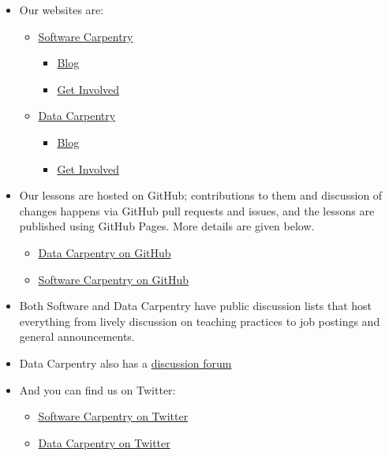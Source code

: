 \begin{itemize}
\item
  Our websites are:

  \begin{itemize}
    \item
    \href{http://software-carpentry.org}{Software Carpentry}

    \begin{itemize}
        \item
      \href{http://software-carpentry.org/blog/}{Blog}
    \item
      \href{http://software-carpentry.org/join/}{Get Involved}
    \end{itemize}
  \item
    \href{http://datacarpentry.org}{Data Carpentry}

    \begin{itemize}
        \item
      \href{http://datacarpentry.org/blog/}{Blog}
    \item
      \href{http://datacarpentry.org/involved/}{Get Involved}
    \end{itemize}
  \end{itemize}
\item
  Our lessons are hosted on GitHub; contributions to them and discussion
  of changes happens via GitHub pull requests and issues, and the
  lessons are published using GitHub Pages. More details are given
  below.

  \begin{itemize}
    \item
    \href{https://github.com/datacarpentry}{Data Carpentry on GitHub}
  \item
    \href{https://github.com/swcarpentry}{Software Carpentry on GitHub}
  \end{itemize}
\item
  Both Software and Data Carpentry have public discussion lists that
  host everything from lively discussion on teaching practices to job
  postings and general announcements.
\item
  Data Carpentry also has a
  \href{http://discuss.datacarpentry.org/}{discussion forum}
\item
  And you can find us on Twitter:

  \begin{itemize}
    \item
    \href{https://twitter.com/swcarpentry}{Software Carpentry on
    Twitter}
  \item
    \href{https://twitter.com/datacarpentry}{Data Carpentry on Twitter}
  \end{itemize}
\end{itemize}

